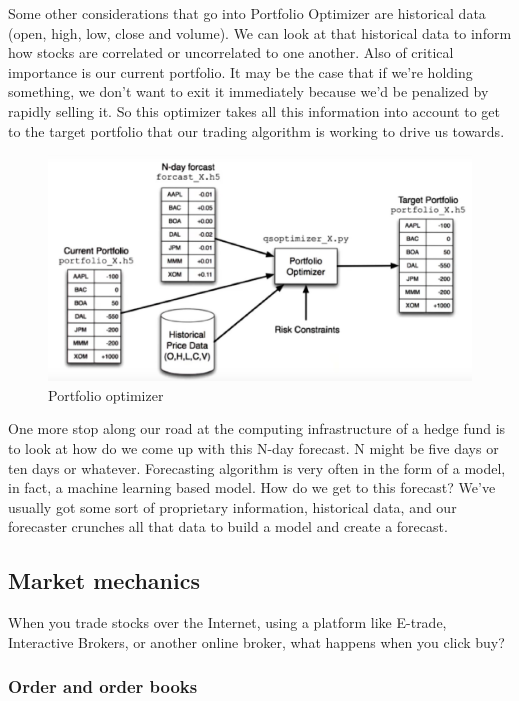 \documentclass[12pt]{article}
\begin{document}
Some other considerations that go into Portfolio Optimizer are historical data (open, high, low, close and volume). We can look at that historical data to inform how stocks are correlated or uncorrelated to one another. Also of critical importance is our current portfolio. It may be the case that if we're holding something, we don't want to exit it immediately because we'd be penalized by rapidly selling it. So this optimizer takes all this information into account to get to the target portfolio that our trading algorithm is working to drive us towards. \\ [8pt]
\begin{figure}[!ht]
\centering
\includegraphics[scale=0.35]{fig/fig26}
\caption{Portfolio optimizer}
\end{figure}
\noindent
One more stop along our road at the computing infrastructure of a hedge fund is to look at how do we come up with this N-day forecast. N might be five days or ten days or whatever. Forecasting algorithm is very often in the form of a model, in fact, a machine learning based model. How do we get to this forecast? We've usually got some sort of proprietary information, historical data, and our forecaster crunches all that data to build a model and create a forecast. 

\subsection{Market mechanics}

When you trade stocks over the Internet, using a platform like E-trade, Interactive Brokers, or another online broker, what happens when you click buy?

\subsubsection{Order and order books}
\end{document}
